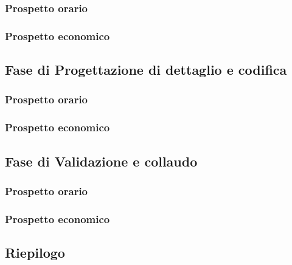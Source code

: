 \subsubsection{Prospetto orario}

\subsubsection{Prospetto economico}

\subsection{Fase di Progettazione di dettaglio e codifica}
\subsubsection{Prospetto orario}

\subsubsection{Prospetto economico}

\subsection{Fase di Validazione e collaudo}
\subsubsection{Prospetto orario}

\subsubsection{Prospetto economico}

\subsection{Riepilogo}